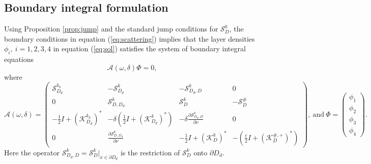 \documentclass[a4paper]{article}
\theoremstyle{definition}
\newcommand{\A}{\mathcal{A}}
\renewcommand{\S}{\mathcal{S}}
\newcommand{\K}{\mathcal{K}}
\newcommand{\Scrystal}{\mathcal{S}_D^\#}
\newcommand{\eqnref}[1]{(\ref {#1})}
\begin{document}
\subsection{Boundary integral formulation}
Using Proposition \ref{prop:jump} and the standard jump conditions for $\S_D^0$, the boundary conditions in equation \eqnref{eq:scattering} implies that the layer densities $\phi_i,\ i=1,2,3,4$ in equation \eqnref{eq:sol} satisfies the system of boundary integral equations
\[\A(\omega, \delta)\Phi = 0,\] where
\begin{equation} \label{eq:A}
\A(\omega, \delta) = 
\begin{pmatrix}
\S_{D_d}^{k_b} &  -\S_{D_d}^{k} & -\S_{D_d,D}^{k} & 0 \\
0 & \S_{D,D_d}^k & \S_{D}^k & -\Scrystal \\
-\frac{1}{2}I+ (\K_{D_d}^{k_b})^*& -\delta\left( \frac{1}{2}I+ (\K_{D_d}^{k})^*\right) & -\delta \frac{\partial \S_{D_d,D}^{k}}{\partial \nu} & 0 \\
0 & \frac{\partial \S_{D,D_d}^{k}}{\partial \nu} & -\frac{1}{2}I+ (\K_D^{k})^* & -\left( \frac{c}{2}I+ \left(\K_D^{\#,+}\right)^*\right)
\end{pmatrix}, 
\ \text{and}  \ \Phi= 
\begin{pmatrix}
\phi_1\\
\phi_2 \\
\phi_3 \\
\phi_4
\end{pmatrix}.
\end{equation}
Here the operator $\S_{D_d,D}^{k} = \S_{D}^{k}|_{x\in \partial D_d}$ is the restriction of $\S_{D}^{k}$ onto $\partial D_d$.
\end{document}
